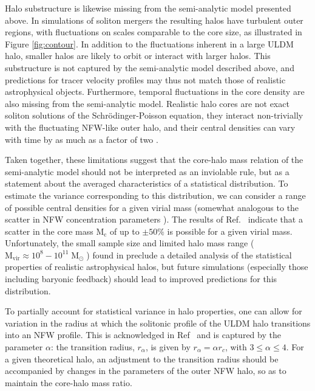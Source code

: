 \documentclass{pasa}%
\begin{document}
Halo substructure is likewise missing from the semi-analytic model presented above. In simulations of soliton mergers the resulting halos have turbulent outer regions, with fluctuations on scales comparable to the core size, as illustrated in Figure \ref{fig:contour}. In addition to the fluctuations inherent in a large ULDM halo, smaller halos are likely to orbit or interact with larger halos. This   substructure is not captured by the semi-analytic model described above, and predictions for tracer velocity profiles may thus not match those of realistic astrophysical objects. Furthermore, temporal fluctuations in the core density are also missing from the semi-analytic model. Realistic halo cores are not exact soliton solutions of the Schr\"{o}dinger-Poisson equation,  they interact non-trivially with the fluctuating NFW-like outer halo, and their central densities can vary with time by as much as a factor of two \cite{Veltmaat:2018dfz}.

Taken together, these limitations suggest that the core-halo mass relation of the semi-analytic model should not be interpreted as an inviolable rule, but as a statement about the averaged characteristics of a statistical distribution. To estimate the variance corresponding to this distribution, we can consider a range of possible central densities for a given virial mass (somewhat analogous to the scatter in NFW concentration parameters \cite{Maccio:2008pcd}). The results of Ref.~\cite{Schive:2014hza}  indicate that a scatter in the core mass $\mathrm{M_c}$ of up to $\pm 50\%$ is possible for a given virial mass. Unfortunately, the small sample size and limited halo mass range ($ \mathrm{M_{vir}} \approx 10^8-10^{11} \operatorname{M}_{\odot}$) found in \cite{Schive:2014hza}  preclude a detailed analysis of the statistical properties of realistic astrophysical halos, but future simulations (especially those including baryonic feedback) should lead to improved predictions for this distribution. 

To partially account for statistical variance in halo properties, one can allow for variation in the radius at which the solitonic profile of the ULDM halo transitions into an NFW profile. This is acknowledged in Ref~\cite{Robles:2018fur} and is captured by the parameter $\alpha$: the transition radius, $r_{\alpha}$, is given by $r_{\alpha} = \alpha r_c$, with $3 \leq \alpha \leq 4$. For a given theoretical halo, an adjustment to the transition radius should be accompanied by changes in the parameters of the outer NFW halo, so as to maintain the core-halo mass ratio.
\end{document}
